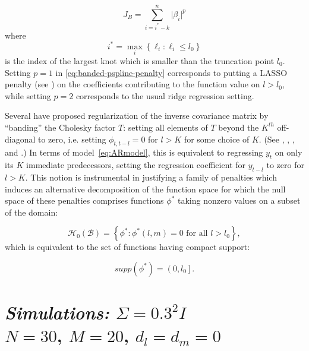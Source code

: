 \documentclass[12pt]{article}
\theoremstyle{definition}
\begin{document}
\begin{equation} \label{eq:banded-pspline-penalty}
J_{B} = \sum_{ i=i^* -k }^n \vert \beta_i \vert^p
\end{equation}
\noindent
where
\[
i^* = \max\limits_{i} \left\{ \ell_i: \ell_i \le l_0 \right\}
\]
is the index of the largest knot which is smaller than the truncation point $l_0$. Setting $p=1$ in \ref{eq:banded-pspline-penalty} corresponds to putting a LASSO penalty (see \citet{tibshirani1996regression}) on the coefficients contributing to the function value on $l > l_0$, while setting $p=2$ corresponds to the usual ridge regression setting. 


Several have proposed regularization of the inverse covariance matrix by ``banding'' the Cholesky factor $T$: setting all elements of $T$ beyond the $K^{th}$ off-diagonal to zero, i.e. setting $\phi_{t,t-l}=0$ for $l > K$ for some choice of $K$.  (See \cite{pourahmadi1999joint}, \citet{wu2003nonparametric}, \cite{bickel2008regularized}, and \cite{huang2007estimation}.) In terms of model~\ref{eq:ARmodel}, this is equivalent to regressing $y_t$  on only its $K$ immediate predecessors, setting the regression coefficient for $y_{t-l}$ to zero for $l>K$.  This notion is instrumental in justifying a family of penalties which induces an alternative decomposition of the function space for which the null space of these penalties comprises functions $\phi^*$ taking nonzero values on a subset of the domain:

\begin{equation} \label{eq:banded-penalty-nullspace}
\mathcal{H}_0\left(\mathcal{B}\right) = \left\{ \phi^*: \phi^*\left(l,m\right) = 0 \mbox{ for all } l > l_0 \right\},
\end{equation}
\noindent
which is equivalent to the set of functions having compact support:

\[
supp\left( \phi^* \right) = \left(0,l_0\right].
\]





 
\section{\emph{Simulations: }$\Sigma = 0.3^2 I$\\
$N = 30$, $M=20$, $d_l = d_m= 0$}
\end{document}
